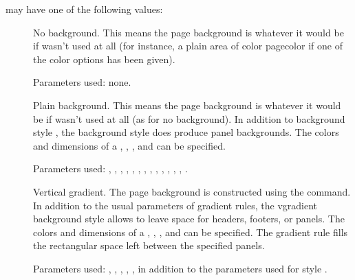 \documentclass[12pt]{scrartcl}
\begin{document}
   may have one of the following values:
  \begin{description}
  \item[]
    No background. This means the page background is whatever it would be if
     wasn't used at all (for instance, a plain area
    of color pagecolor if one of the color options has been given).

    Parameters used: none.

  \item[]
    Plain background. This means the page background is whatever it would be if
     wasn't used at all (as for no background). In
    addition to background style , the background style 
    does produce panel backgrounds. The colors and dimensions of a , , , and  can
    be specified.

    \begin{flushleft}
    Parameters used: , , ,
    , , ,
    , , ,
    , , ,
    , .
    \end{flushleft}

  \item[]
    Vertical gradient. The page background is constructed using the
     command. In addition to the
    usual parameters of gradient rules, the vgradient background style allows
    to leave space for headers, footers, or panels. The colors and dimensions
    of a , , , and
     can be specified. The gradient rule fills the
    rectangular space left between the specified panels.

    \begin{flushleft}
    Parameters used: , ,
    , , , 
    in addition to the parameters used for style .
    \end{flushleft}


\end{description}
\end{document}
